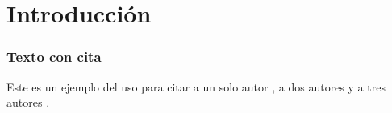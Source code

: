 \documentclass[aspectratio=169]{beamer}%
\author[NOMBRE AUTOR]{
	\href{mailto:\correoa}{\autora}\\
	\href{mailto:\correob}{\autorb}\\
	\href{mailto:\correoc}{\autorc}}
\begin{document}
\begin {frame} [plain]

\titlepage
\end {frame}
\section[Contenido]{}








\section{Introducción}

\begin{frame}[fragile]
	\frametitle{Texto con cita}
	\justifying
Este es un ejemplo del uso para citar a un solo autor \cite{000}, a dos autores \cite{000,001}
y a tres autores \cite{002, 003, 004}.

\end{frame}
\end{document}
